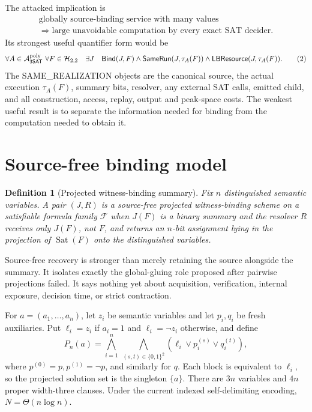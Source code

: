 \documentclass[11pt]{article}
\newtheorem{definition}{Definition}
\newcommand{\SAT}{\mathsf{3SAT}}
\begin{document}
The attacked implication is
\[
 \begin{gathered}
 \text{globally source-binding service with many values}\\
 \Longrightarrow
 \text{large unavoidable computation by every exact SAT decider}.
 \end{gathered}                                                           \tag{1}
\]
Its strongest useful quantifier form would be
\[
 \forall A\in\mathcal A_{\SAT}^{\rm poly}\ \forall F\in\mathcal H_{2,2}
 \quad \exists J\quad
 \mathsf{Bind}(J,F)\wedge
 \mathsf{SameRun}(J,\tau_A(F))\wedge
 \mathsf{LBResource}(J,\tau_A(F)).                                      \tag{2}
\]
The SAME\_REALIZATION objects are the canonical source, the actual execution
$\tau_A(F)$, summary bits, resolver, any external SAT calls, emitted child,
and all construction, access, replay, output and peak-space costs.  The
weakest useful result is to separate the information needed for binding from
the computation needed to obtain it.

\section{Source-free binding model}
\begin{definition}[Projected witness-binding summary]
Fix $n$ distinguished semantic variables.  A pair $(J,R)$ is a source-free
projected witness-binding scheme on a satisfiable formula family $\mathcal F$
when $J(F)$ is a binary summary and the resolver $R$ receives only $J(F)$,
not $F$, and returns an $n$-bit assignment lying in the projection of
$\operatorname{Sat}(F)$ onto the distinguished variables.
\end{definition}

Source-free recovery is stronger than merely retaining the source alongside
the summary.  It isolates exactly the global-gluing role proposed after
pairwise projections failed.  It says nothing yet about acquisition,
verification, internal exposure, decision time, or strict contraction.

For $a=(a_1,\ldots,a_n)$, let $z_i$ be semantic variables and let $p_i,q_i$
be fresh auxiliaries.  Put $\ell_i=z_i$ if $a_i=1$ and
$\ell_i=\neg z_i$ otherwise, and define
\[
P_n(a)=\bigwedge_{i=1}^n\ \bigwedge_{(s,t)\in\{0,1\}^2}
 (\ell_i\vee p_i^{(s)}\vee q_i^{(t)}),                                  \tag{3}
\]
where $p^{(0)}=p,p^{(1)}=\neg p$, and similarly for $q$.
Each block is equivalent to $\ell_i$, so the projected solution set is the
singleton $\{a\}$.  There are $3n$ variables and $4n$ proper width-three
clauses.  Under the current indexed self-delimiting encoding,
$N=\Theta(n\log n)$.
\end{document}
